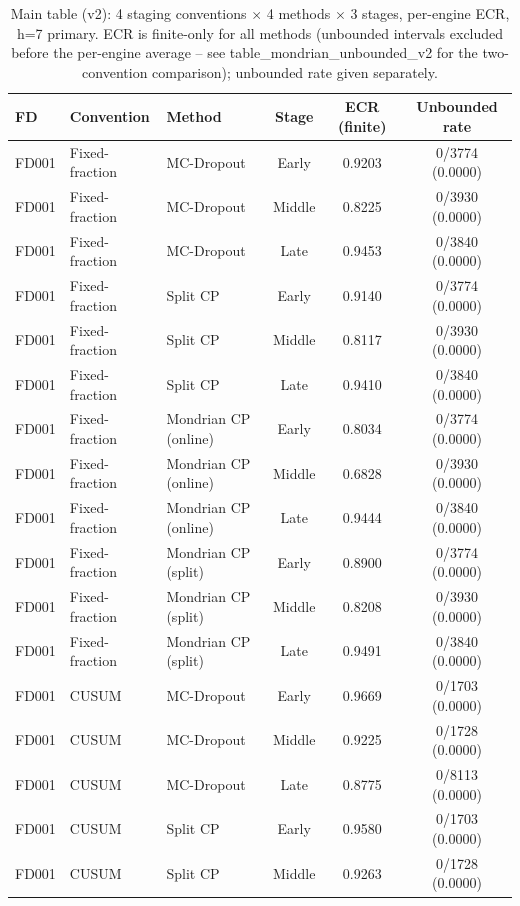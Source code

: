 \begin{table}[t]
\caption{Main table (v2): 4 staging conventions $\times$ 4 methods $\times$ 3 stages, per-engine ECR, h=7 primary. ECR is finite-only for all methods (unbounded intervals excluded before the per-engine average -- see table\_mondrian\_unbounded\_v2 for the two-convention comparison); unbounded rate given separately.}
\label{tab:main-v2}
\centering
\small
\begin{tabular}{lllccc}
\toprule
FD & Convention & Method & Stage & ECR (finite) & Unbounded rate \\
\midrule
FD001 & Fixed-fraction & MC-Dropout & Early & 0.9203 & 0/3774 (0.0000) \\
FD001 & Fixed-fraction & MC-Dropout & Middle & 0.8225 & 0/3930 (0.0000) \\
FD001 & Fixed-fraction & MC-Dropout & Late & 0.9453 & 0/3840 (0.0000) \\
FD001 & Fixed-fraction & Split CP & Early & 0.9140 & 0/3774 (0.0000) \\
FD001 & Fixed-fraction & Split CP & Middle & 0.8117 & 0/3930 (0.0000) \\
FD001 & Fixed-fraction & Split CP & Late & 0.9410 & 0/3840 (0.0000) \\
FD001 & Fixed-fraction & Mondrian CP (online) & Early & 0.8034 & 0/3774 (0.0000) \\
FD001 & Fixed-fraction & Mondrian CP (online) & Middle & 0.6828 & 0/3930 (0.0000) \\
FD001 & Fixed-fraction & Mondrian CP (online) & Late & 0.9444 & 0/3840 (0.0000) \\
FD001 & Fixed-fraction & Mondrian CP (split) & Early & 0.8900 & 0/3774 (0.0000) \\
FD001 & Fixed-fraction & Mondrian CP (split) & Middle & 0.8208 & 0/3930 (0.0000) \\
FD001 & Fixed-fraction & Mondrian CP (split) & Late & 0.9491 & 0/3840 (0.0000) \\
FD001 & CUSUM & MC-Dropout & Early & 0.9669 & 0/1703 (0.0000) \\
FD001 & CUSUM & MC-Dropout & Middle & 0.9225 & 0/1728 (0.0000) \\
FD001 & CUSUM & MC-Dropout & Late & 0.8775 & 0/8113 (0.0000) \\
FD001 & CUSUM & Split CP & Early & 0.9580 & 0/1703 (0.0000) \\
FD001 & CUSUM & Split CP & Middle & 0.9263 & 0/1728 (0.0000) \\

\end{tabular}
\end{table}
